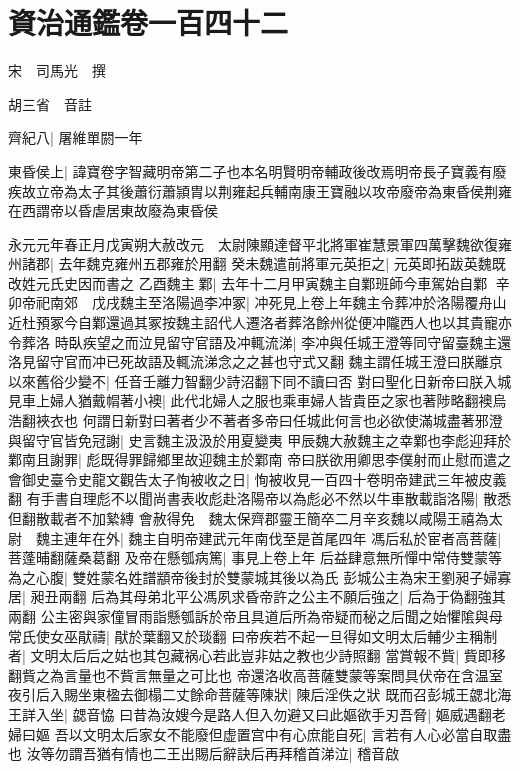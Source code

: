 \chapter{資治通鑑卷一百四十二}
宋　司馬光　撰

胡三省　音註

齊紀八|{
	屠維單閼一年}


東昏侯上|{
	諱寶卷字智藏明帝第二子也本名明賢明帝輔政後改焉明帝長子寶義有廢疾故立帝為太子其後蕭衍蕭頴胄以荆雍起兵輔南康王寶融以攻帝廢帝為東昏侯荆雍在西謂帝以昏虐居東故廢為東昏侯}


永元元年春正月戊寅朔大赦改元　太尉陳顯達督平北將軍崔慧景軍四萬擊魏欲復雍州諸郡|{
	去年魏克雍州五郡雍於用翻}
癸未魏遣前將軍元英拒之|{
	元英即拓跋英魏既改姓元氏史因而書之}
乙酉魏主鄴|{
	去年十二月甲寅魏主自鄴班師今車駕始自鄴}
辛卯帝祀南郊　戊戌魏主至洛陽過李冲冢|{
	冲死見上卷上年魏主令葬冲於洛陽覆舟山近杜預冢今自鄴還過其冢按魏主詔代人遷洛者葬洛餘州從便冲隴西人也以其貴寵亦令葬洛}
時臥疾望之而泣見留守官語及冲輒流涕|{
	李冲與任城王澄等同守留臺魏主還洛見留守官而冲已死故語及輒流涕念之之甚也守式又翻}
魏主謂任城王澄曰朕離京以來舊俗少變不|{
	任音壬離力智翻少詩沼翻下同不讀曰否}
對曰聖化日新帝曰朕入城見車上婦人猶戴㡌著小襖|{
	此代北婦人之服也乘車婦人皆貴臣之家也著陟略翻襖烏浩翻裌衣也}
何謂日新對曰著者少不著者多帝曰任城此何言也必欲使滿城盡著邪澄與留守官皆免冠謝|{
	史言魏主汲汲於用夏變夷}
甲辰魏大赦魏主之幸鄴也李彪迎拜於鄴南且謝罪|{
	彪既得罪歸鄉里故迎魏主於鄴南}
帝曰朕欲用卿思李僕射而止慰而遣之會御史臺令史龍文觀告太子恂被收之日|{
	恂被收見一百四十卷明帝建武三年被皮義翻}
有手書自理彪不以聞尚書表收彪赴洛陽帝以為彪必不然以牛車散載詣洛陽|{
	散悉但翻散載者不加縶縳}
會赦得免　魏太保齊郡靈王簡卒二月辛亥魏以咸陽王禧為太尉　魏主連年在外|{
	魏主自明帝建武元年南伐至是首尾四年}
馮后私於宦者高菩薩|{
	菩蓬晡翻薩桑葛翻}
及帝在懸瓠病篤|{
	事見上卷上年}
后益肆意無所憚中常侍雙蒙等為之心腹|{
	雙姓蒙名姓譜顓帝後封於雙蒙城其後以為氏}
彭城公主為宋王劉昶子婦寡居|{
	昶丑兩翻}
后為其母弟北平公馮夙求昏帝許之公主不願后強之|{
	后為于偽翻強其兩翻}
公主密與家僮冒雨詣懸瓠訴於帝且具道后所為帝疑而秘之后聞之始懼隂與母常氏使女巫猒禱|{
	猒於葉翻又於琰翻}
曰帝疾若不起一旦得如文明太后輔少主稱制者|{
	文明太后后之姑也其包藏祸心若此豈非姑之教也少詩照翻}
當賞報不貲|{
	貲即移翻貲之為言量也不貲言無量之可比也}
帝還洛收高菩薩雙蒙等案問具伏帝在含温室夜引后入賜坐東楹去御榻二丈餘命菩薩等陳狀|{
	陳后淫佚之狀}
既而召彭城王勰北海王詳入坐|{
	勰音恊}
曰昔為汝嫂今是路人但入勿避又曰此嫗欲手刃吾脅|{
	嫗威遇翻老婦曰嫗}
吾以文明太后家女不能廢但虚置宫中有心庶能自死|{
	言若有人心必當自取盡也}
汝等勿謂吾猶有情也二王出賜后辭訣后再拜稽首涕泣|{
	稽音啟}
